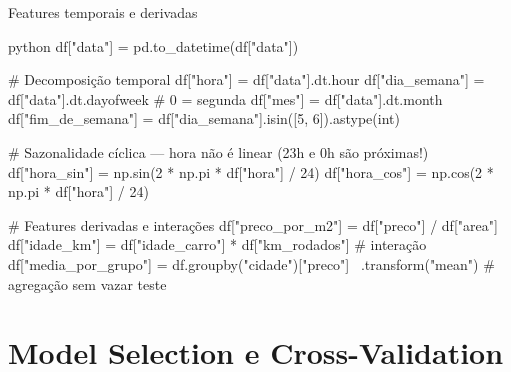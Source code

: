 \documentclass[xcolor=dvipsnames,t,aspectratio=169]{beamer}
\begin{document}
\begin{frame}[c, fragile]{Features temporais e derivadas}

\begin{code}{python}
df["data"] = pd.to_datetime(df["data"])

# Decomposição temporal
df["hora"]         = df["data"].dt.hour
df["dia_semana"]   = df["data"].dt.dayofweek   # 0 = segunda
df["mes"]          = df["data"].dt.month
df["fim_de_semana"] = df["dia_semana"].isin([5, 6]).astype(int)

# Sazonalidade cíclica — hora não é linear (23h e 0h são próximas!)
df["hora_sin"] = np.sin(2 * np.pi * df["hora"] / 24)
df["hora_cos"] = np.cos(2 * np.pi * df["hora"] / 24)

# Features derivadas e interações
df["preco_por_m2"]   = df["preco"] / df["area"]
df["idade_km"]       = df["idade_carro"] * df["km_rodados"]  # interação
df["media_por_grupo"] = df.groupby("cidade")["preco"] \
                          .transform("mean")  # agregação sem vazar teste
\end{code}

\end{frame}


\section{Model Selection e Cross-Validation}
\end{document}

